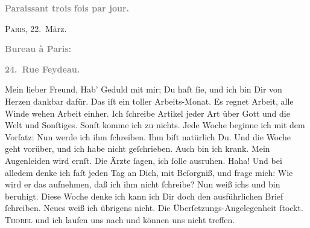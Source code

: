 \pstart
           \begin{otherlanguage}{french}\textcolor{gray}{\textbf{\textbf{Paraissant trois fois par jour.}}}\end{otherlanguage}\hfill \textsc{Paris}, 22. März.\pend
           
\pstart
           \begin{otherlanguage}{french}\textcolor{gray}{\textbf{\textbf{Bureau à Paris:}}}\end{otherlanguage}\pend
           
\pstart
           \begin{otherlanguage}{french}\textcolor{gray}{\textbf{\textbf{24. Rue Feydeau.}}}\end{otherlanguage}\pend
           
\pstart\center{}Mein lieber Freund,\pend\vspace{0.5em}
\pstart
           Hab’ Geduld mit mir; Du haſt{ }ſie, und ich bin Dir von Herzen dankbar dafür. Das iſt
               ein toller Arbeits-Monat. Es regnet Arbeit, alle Winde
               wehen Arbeit einher. Ich{ }ſchreibe Artikel jeder Art über Gott und die Welt und
               Sonſtiges. Sonſt komme ich zu nichts. Jede Woche beginne ich mit dem Vorſatz: Nun
               werde ich ihm{ }ſchreiben. Ihm biſt natürlich Du. Und die Woche geht vorüber, und ich
               habe nicht geſchrieben. {\pb}Auch bin ich krank. Mein
               Augenleiden wird ernſt. Die Ärzte{ }ſagen, ich{ }ſolle ausruhen. Haha! Und bei alledem
               denke ich faſt jeden Tag an Dich, mit Beſorgniß, und frage mich: Wie wird er das
               aufnehmen, daß ich ihm nicht{ }ſchreibe? Nun weiß ichs und bin beruhigt. Diese Woche
               denke ich kann ich Dir doch den ausführlichen Brief{ }ſchreiben. Neues weiß ich
               übrigens nicht. Die Überſetzungs-Angelegenheit{ }ſtockt. \textsc{Thorel} und ich laufen uns nach und können {\pb}uns nicht
               treffen.\pend
           
